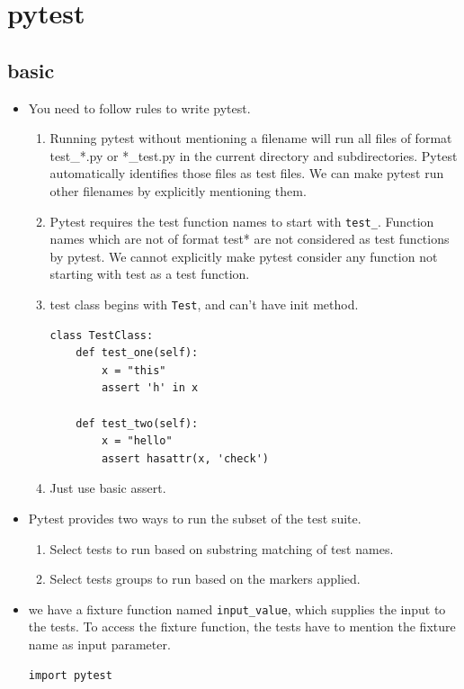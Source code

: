 \documentclass[a4paper,11pt,twoside]{book}
\begin{document}
\section{pytest}
\subsection{basic}

\begin{itemize}
	
	\item You need to follow rules to write pytest.
	\begin{enumerate}
		\item Running pytest without mentioning a filename will run all files of format test\_*.py or *\_test.py in the current directory and subdirectories. Pytest automatically identifies those files as test files. We can make pytest run other filenames by explicitly mentioning them.
		
		\item Pytest requires the test function names to start with \texttt{test\_}. Function names which are not of format test* are not considered as test functions by pytest. We cannot explicitly make pytest consider any function not starting with test as a test function.
		
		\item test class begins with \texttt{Test}, and can't have init method.
\begin{lstlisting}
class TestClass:  
	def test_one(self):  
		x = "this"  
		assert 'h' in x  

	def test_two(self):  
		x = "hello"  
		assert hasattr(x, 'check')
\end{lstlisting}
		
		\item Just use basic assert.
	\end{enumerate}

	
	\item Pytest provides two ways to run the subset of the test suite.
	\begin{enumerate}
		\item Select tests to run based on substring matching of test names.
		\item Select tests groups to run based on the markers applied.
	\end{enumerate}
	
	\item  we have a fixture function named \texttt{input\_value}, which supplies the input to the tests. To access the fixture function, the tests have to mention the fixture name as input parameter.
\begin{lstlisting}
import pytest


\end{lstlisting}
\end{itemize}
\end{document}
